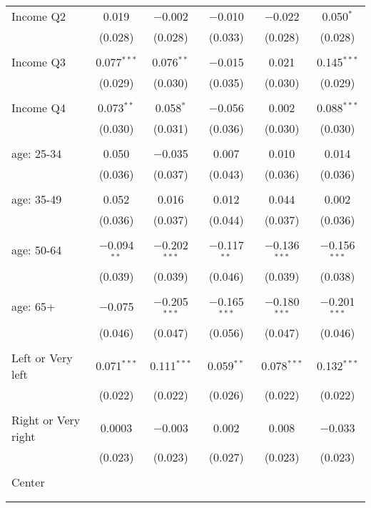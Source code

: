 \begin{tabular}{@{\extracolsep{5pt}}lccccc}
 Income Q2 & 0.019 & $-$0.002 & $-$0.010 & $-$0.022 & 0.050$^{*}$ \\ 
  & (0.028) & (0.028) & (0.033) & (0.028) & (0.028) \\ 
  & & & & & \\ 
 Income Q3 & 0.077$^{***}$ & 0.076$^{**}$ & $-$0.015 & 0.021 & 0.145$^{***}$ \\ 
  & (0.029) & (0.030) & (0.035) & (0.030) & (0.029) \\ 
  & & & & & \\ 
 Income Q4 & 0.073$^{**}$ & 0.058$^{*}$ & $-$0.056 & 0.002 & 0.088$^{***}$ \\ 
  & (0.030) & (0.031) & (0.036) & (0.030) & (0.030) \\ 
  & & & & & \\ 
 age: 25-34 & 0.050 & $-$0.035 & 0.007 & 0.010 & 0.014 \\ 
  & (0.036) & (0.037) & (0.043) & (0.036) & (0.036) \\ 
  & & & & & \\ 
 age: 35-49 & 0.052 & 0.016 & 0.012 & 0.044 & 0.002 \\ 
  & (0.036) & (0.037) & (0.044) & (0.037) & (0.036) \\ 
  & & & & & \\ 
 age: 50-64 & $-$0.094$^{**}$ & $-$0.202$^{***}$ & $-$0.117$^{**}$ & $-$0.136$^{***}$ & $-$0.156$^{***}$ \\ 
  & (0.039) & (0.039) & (0.046) & (0.039) & (0.038) \\ 
  & & & & & \\ 
 age: 65+ & $-$0.075 & $-$0.205$^{***}$ & $-$0.165$^{***}$ & $-$0.180$^{***}$ & $-$0.201$^{***}$ \\ 
  & (0.046) & (0.047) & (0.056) & (0.047) & (0.046) \\ 
  & & & & & \\ 
 Left or Very left & 0.071$^{***}$ & 0.111$^{***}$ & 0.059$^{**}$ & 0.078$^{***}$ & 0.132$^{***}$ \\ 
  & (0.022) & (0.022) & (0.026) & (0.022) & (0.022) \\ 
  & & & & & \\ 
 Right or Very right & 0.0003 & $-$0.003 & 0.002 & 0.008 & $-$0.033 \\ 
  & (0.023) & (0.023) & (0.027) & (0.023) & (0.023) \\ 
  & & & & & \\ 
 Center &  &  &  &  &  \\ 
  &  &  &  &  &  \\ 
  & & & & & \\ 

\end{tabular}
